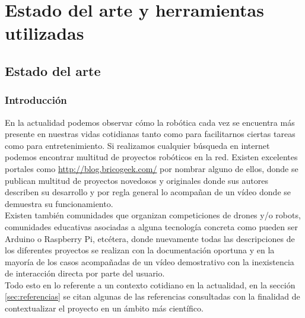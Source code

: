 

\chapter[Estado del arte y herramientas utilizadas]{Estado del arte y herramientas utilizadas}
\label{chap:herramientas}


\section{ Estado del arte }

\subsection{Introducción}

En la actualidad podemos observar cómo la robótica cada vez se encuentra más presente en nuestras vidas cotidianas tanto como para facilitarnos ciertas tareas como para entretenimiento. Si realizamos 
cualquier búsqueda en internet podemos encontrar multitud de proyectos robóticos en la red. Existen excelentes portales como \url{http://blog.bricogeek.com/} por nombrar alguno de ellos, donde se
publican multitud de proyectos novedosos y originales donde sus autores describen su desarrollo y por regla general lo acompañan de un vídeo donde se demuestra su funcionamiento.\\

Existen también comunidades que organizan competiciones de drones y/o robots, comunidades educativas asociadas a alguna tecnología concreta como pueden ser Arduino o Raspberry Pi, etcétera, donde nuevamente todas las 
descripciones de los diferentes proyectos se realizan con la documentación oportuna y en la mayoría de los casos acompañadas de un vídeo demostrativo con la inexistencia de interacción directa por parte 
del usuario.\\

Todo esto en lo referente a un contexto cotidiano en la actualidad, en la sección \ref{sec:referencias} se citan algunas de las referencias consultadas con la finalidad de contextualizar el proyecto 
en un ámbito más científico.\\

